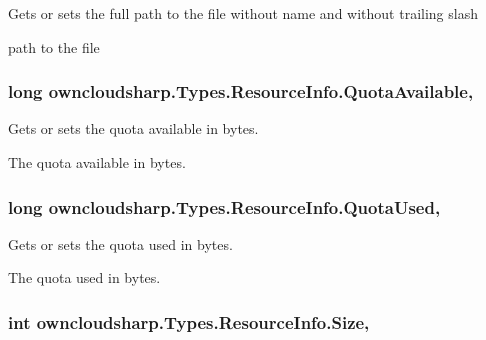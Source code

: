 Gets or sets the full path to the file without name and without trailing slash 

path to the file\hypertarget{classowncloudsharp_1_1_types_1_1_resource_info_a403b7595a054cac793ca29feac27b4e1}{}
\subsubsection[{Quota\+Available}]{\setlength{\rightskip}{0pt plus 5cm}long owncloudsharp.\+Types.\+Resource\+Info.\+Quota\+Available\hspace{0.3cm}{\ttfamily [get]}, {\ttfamily [set]}}\label{classowncloudsharp_1_1_types_1_1_resource_info_a403b7595a054cac793ca29feac27b4e1}


Gets or sets the quota available in bytes. 

The quota available in bytes.\hypertarget{classowncloudsharp_1_1_types_1_1_resource_info_ab9f4b3822dfabcdb61023c0b200e4785}{}
\subsubsection[{Quota\+Used}]{\setlength{\rightskip}{0pt plus 5cm}long owncloudsharp.\+Types.\+Resource\+Info.\+Quota\+Used\hspace{0.3cm}{\ttfamily [get]}, {\ttfamily [set]}}\label{classowncloudsharp_1_1_types_1_1_resource_info_ab9f4b3822dfabcdb61023c0b200e4785}


Gets or sets the quota used in bytes. 

The quota used in bytes.\hypertarget{classowncloudsharp_1_1_types_1_1_resource_info_a57a5a4cfa8448999170ff68297d262f1}{}
\subsubsection[{Size}]{\setlength{\rightskip}{0pt plus 5cm}int owncloudsharp.\+Types.\+Resource\+Info.\+Size\hspace{0.3cm}{\ttfamily [get]}, {\ttfamily [set]}}\label{classowncloudsharp_1_1_types_1_1_resource_info_a57a5a4cfa8448999170ff68297d262f1}


